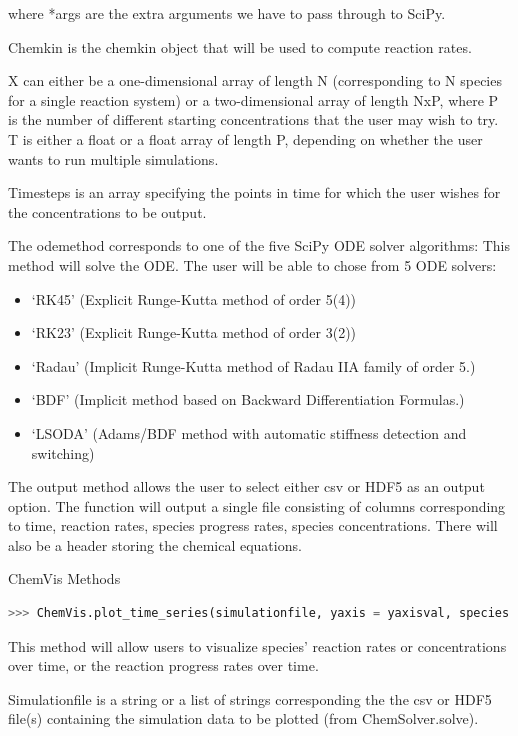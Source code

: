 \documentclass[12pt]{article}
\begin{document}
where *args are the extra arguments we have to pass through to SciPy.

Chemkin is the chemkin object that will be used to compute reaction rates. 

X can either be a one-dimensional array of length N (corresponding to N species for a single reaction system) or a two-dimensional array of length NxP, where P is the number of different starting concentrations that the user may wish to try. T is either a float or a float array of length P, depending on whether the user wants to run multiple simulations. 

Timesteps is an array specifying the points in time for which the user wishes for the concentrations to be output. 

The odemethod corresponds to one of the five SciPy ODE solver algorithms: 
This method will solve the ODE. The user will be able to chose from 5 ODE solvers: 
\begin{itemize}
\item ‘RK45’ (Explicit Runge-Kutta method of order 5(4))
\item ‘RK23’ (Explicit Runge-Kutta method of order 3(2))
\item ‘Radau’ (Implicit Runge-Kutta method of Radau IIA family of order 5.)
\item ‘BDF’ (Implicit method based on Backward Differentiation Formulas.)
\item ‘LSODA’ (Adams/BDF method with automatic stiffness detection and switching)
\end{itemize}

The output method allows the user to select either csv or HDF5 as an output option. The function will output a single file consisting of columns corresponding to time, reaction rates, species progress rates, species concentrations. There will also be a header storing the chemical equations. 


ChemVis Methods

\begin{lstlisting}[language = Python, basicstyle = \ttfamily, breaklines = True, columns = fullflexible]
>>> ChemVis.plot_time_series(simulationfile, yaxis = yaxisval, species = [list of species], timerange = timerange)
\end{lstlisting}


This method will allow users to visualize species’ reaction rates or concentrations over time, or the reaction progress rates over time. 

Simulationfile is a string or a list of strings corresponding the the csv or HDF5 file(s) containing the simulation data to be plotted (from ChemSolver.solve).
\end{document}
